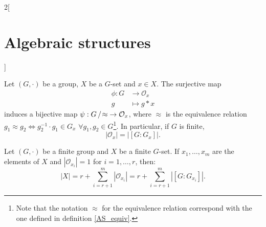 \documentclass[../../../main.tex]{subfiles}
\begin{document}
\begin{multicols}{2}[\section{Algebraic structures}]
\begin{prop}
\end{prop}
\begin{theorem}
    Let $(G,\cdot)$ be a group, $X$ be a $G$-set and $x\in X$. The surjective map
    \begin{align*}
        \phi:G&\longrightarrow \mathcal{O}_x\\
        g&\longmapsto g*x
    \end{align*}
    induces a bijective map $\psi:\quot{G}{\!\!\approx}\;\rightarrow\mathcal{O}_x$, where $\approx$ is the equivalence relation $g_1\approx g_2\iff g_2^{-1}\cdot g_1\in G_x$ $\forall g_1,g_2\in G$\footnote{Note that the notation $\approx$ for the equivalence relation correspond with the one defined in definition \ref{AS_equiv}.}. In particular, if $G$ is finite, $$|\mathcal{O}_x|=|[G:G_x]|.$$
\end{theorem}
\begin{corollary}
    Let $(G,\cdot)$ be a finite group and $X$ be a finite $G$-set. If $x_1,\ldots,x_m$ are the elements of $X$ and $|\mathcal{O}_{x_i}|=1$ for $i=1,\ldots,r$, then:
    \begin{equation}
        |X|=r+\sum_{i=r+1}^m|\mathcal{O}_{x_i}|=r+\sum_{i=r+1}^m|[G:G_{x_i}]|.
        \label{EA-obritsformula}
    \end{equation}
\end{corollary}

\end{multicols}
\end{document}
